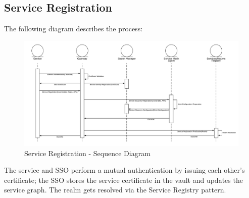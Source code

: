 \documentclass{article}
\begin{document}
\newpage

\subsection{Service Registration}
The following diagram describes the process:
\begin{figure}[h]
    \centering
    \includegraphics[scale=0.33]{Service_Registration-Sequence_Diagram.jpeg}
    \caption{Service Registration - Sequence Diagram}
    \label{fig:Service_Registration}
\end{figure}{}

\medskip
The service and SSO perform a mutual authentication by issuing each other's certificate; the SSO stores the service certificate in the vault and updates the service graph. The realm gets resolved via the Service Registry pattern.

\newpage
\end{document}
